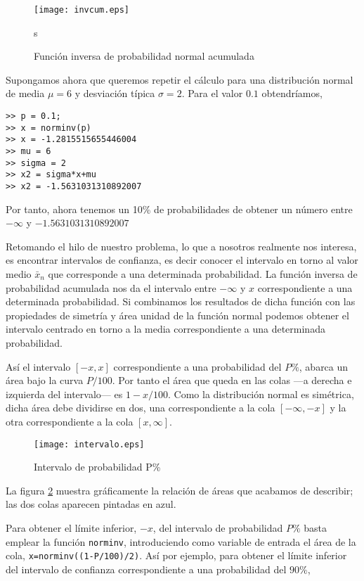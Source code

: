 \begin{figure}[h]
\centering
\texttt{[image: invcum.eps]}
\caption{Función inversa  de probabilidad normal acumulada}
\label{fig:invcum}s
\end{figure}

Supongamos ahora que queremos repetir el cálculo para una distribución normal de media $\mu=6$ y desviación típica $\sigma = 2$. Para el valor $0.1$ obtendríamos,

\begin{verbatim}
>> p = 0.1;
>> x = norminv(p)
>> x = -1.2815515655446004
>> mu = 6
>> sigma = 2
>> x2 = sigma*x+mu
>> x2 = -1.5631031310892007
\end{verbatim}

Por tanto, ahora tenemos un 10\% de probabilidades de obtener un número entre $-\infty$ y $-1.5631031310892007$

Retomando el hilo de nuestro problema, lo que a nosotros realmente nos interesa, es encontrar intervalos de confianza, es decir conocer el intervalo en torno al valor medio $\bar{x}_n$ que corresponde a una determinada probabilidad. La función inversa de probabilidad acumulada nos da el intervalo entre $-\infty$ y $x$ correspondiente a una determinada probabilidad. Si combinamos los resultados de dicha función con las propiedades de simetría y área unidad de la función normal podemos obtener el intervalo centrado en torno a la media correspondiente a una determinada probabilidad.

Así el intervalo $[-x ,x]$ correspondiente a  una probabilidad del $P\%$, abarca un área bajo la curva $P/100$. Por tanto el área que queda en las colas ---a derecha e izquierda del intervalo--- es $1-x/100$. Como la distribución normal es simétrica, dicha área debe dividirse en dos, una correspondiente a la cola $[-\infty, -x]$ y la otra correspondiente a la cola $[x, \infty]$.

\begin{figure}[h]
\centering
\texttt{[image: intervalo.eps]}
\caption{Intervalo de probabilidad P\%}
\label{fig:intervalo}
\end{figure}
La figura \ref{fig:intervalo} muestra gráficamente la relación de áreas que acabamos de describir; las dos colas aparecen pintadas en azul. 


Para obtener el límite inferior, $-x$, del intervalo de probabilidad $P\%$ basta emplear la función \texttt{norminv}, introduciendo como variable de entrada el área de la cola, \texttt{x=norminv((1-P/100)/2)}. Así por ejemplo, para obtener el límite inferior del intervalo de confianza correspondiente a una probabilidad del $90\%$,


